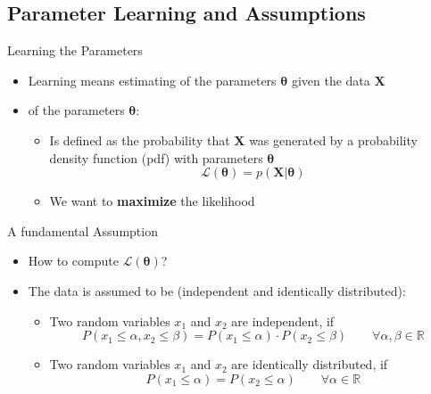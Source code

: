 \subsection{Parameter Learning and Assumptions}

\begin{frame}{Learning the Parameters}{}
	\begin{itemize}
		\item Learning means estimating of the parameters $\bm{\theta}$ given the data $\bm{X}$
		\item {} of the parameters $\bm{\theta}$:
		\begin{itemize}
			\item Is defined as the probability that $\bm{X}$ was generated by a
				probability density function (pdf) with parameters $\bm{\theta}$
			\begin{equation}
				\mathcal{L}(\bm{\theta}) = p(\bm{X} \vert \bm{\theta})
			\end{equation}
			\item We want to \textbf{maximize} the likelihood
		\end{itemize}
	\end{itemize}
	
	\vspace*{2mm}
	\begin{boxBlueNoFrame}
	\end{boxBlueNoFrame}
\end{frame}


\begin{frame}{A fundamental Assumption}{}
	\begin{itemize}
		\item How to compute $\mathcal{L}(\bm{\theta})$?
		\item The data is assumed to be  (independent and identically distributed):
		\begin{itemize}
			\item Two random variables $x_1$ and $x_2$ are independent, if
			\begin{equation}
				P(x_1 \le \alpha, x_2 \le \beta) = P(x_1 \le \alpha) \cdot P(x_2 \le \beta) \qquad \forall \alpha, \beta \in \mathbb{R}
			\end{equation}
			\item Two random variables $x_1$ and $x_2$ are identically distributed, if
			\begin{equation}
				P(x_1 \le \alpha) = P(x_2 \le \alpha) \qquad \forall \alpha \in \mathbb{R}
			\end{equation}
		\end{itemize}
	\end{itemize}
\end{frame}


